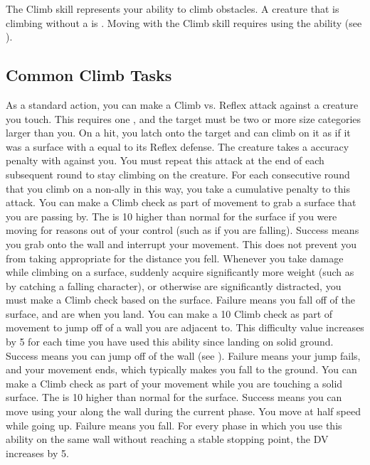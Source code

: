 \newpage
{}
  The Climb skill represents your ability to climb obstacles.
  A creature that is climbing without a  is \unsteady.
  Moving with the Climb skill requires using the  ability (see ).

  \subsection{Common Climb Tasks}
     As a standard action, you can make a Climb vs. Reflex attack against a creature you touch.
    This requires one , and the target must be two or more size categories larger than you.
    On a hit, you latch onto the target and can climb on it as if it was a surface with a  equal to its Reflex defense.
    The creature takes a  accuracy penalty with  against you.
    You must repeat this attack at the end of each subsequent round to stay climbing on the creature.
    For each consecutive round that you climb on a non-ally in this way, you take a cumulative  penalty to this attack.
     You can make a Climb check as part of movement to grab a surface that you are passing by.
    The  is 10 higher than normal for the surface if you were moving for reasons out of your control (such as if you are falling).
    Success means you grab onto the wall and interrupt your movement.
    This does not prevent you from taking  appropriate for the distance you fell.
     Whenever you take damage while climbing on a surface, suddenly acquire significantly more weight (such as by catching a falling character), or otherwise are significantly distracted, you must make a Climb check based on the surface.
    Failure means you fall off of the surface, and are \prone when you land.
     You can make a  10 Climb check as part of movement to jump off of a wall you are adjacent to.
    This difficulty value increases by 5 for each time you have used this ability since landing on solid ground.
    Success means you can jump off of the wall (see ).
    Failure means your jump fails, and your movement ends, which typically makes you fall to the ground.
     You can make a Climb check as part of your movement while you are touching a solid surface.
    The  is 10 higher than normal for the surface.
    Success means you can move using your  along the wall during the current phase.
    You move at half speed while going up.
    Failure means you fall.
    For every phase in which you use this ability on the same wall without reaching a stable stopping point, the DV increases by 5.

